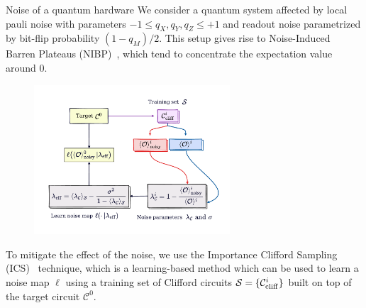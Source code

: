 \documentclass[20pt, final]{beamer}
\newlength{\colwidth}
\begin{document}
\begin{frame}[t]
\begin{columns}[t]
\begin{column}{\colwidth}
\begin{block}{Noise of a quantum hardware}
We consider a quantum system affected by local pauli noise with parameters 
$-1 \leq q_X, q_Y, q_Z \leq +1$ and readout noise parametrized by bit-flip probability 
$(1-q_M)/2$. This setup gives rise to Noise-Induced Barren Plateaus (NIBP)~\cite{nibp}, which tend 
to concentrate the expectation value around 0. 
    \begin{figure}
    \includegraphics[width=0.65\textwidth]{figures/ics.pdf}%
    \end{figure}
To mitigate the effect of the noise, we use the Importance Clifford Sampling (ICS)~\cite{ics}
technique, which is a learning-based method which can be used to learn a noise 
map $\ell$ using a training set of Clifford circuits $\mathcal{S}=\{\mathcal{C}^i_{\rm cliff}\}$
built on top of the target circuit $\mathcal{C}^0$.
\end{block}


\end{column}
\end{columns}
\end{frame}
\end{document}
